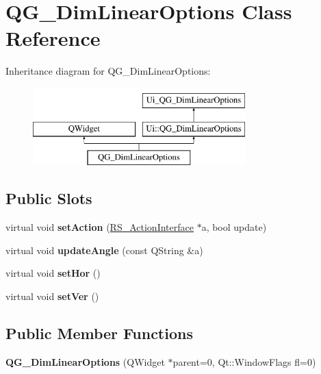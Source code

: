 \hypertarget{classQG__DimLinearOptions}{\section{Q\-G\-\_\-\-Dim\-Linear\-Options Class Reference}
\label{classQG__DimLinearOptions}
}
Inheritance diagram for Q\-G\-\_\-\-Dim\-Linear\-Options\-:\begin{figure}[H]
\begin{center}
\leavevmode
\includegraphics[height=3.000000cm]{classQG__DimLinearOptions}
\end{center}
\end{figure}
\subsection*{Public Slots}
\begin{DoxyCompactItemize}
\item 
\hypertarget{classQG__DimLinearOptions_a56da80fba8a01c219ee84cd62687ad71}{virtual void {\bfseries set\-Action} (\hyperlink{classRS__ActionInterface}{R\-S\-\_\-\-Action\-Interface} $\ast$a, bool update)}\label{classQG__DimLinearOptions_a56da80fba8a01c219ee84cd62687ad71}

\item 
\hypertarget{classQG__DimLinearOptions_a03cb7a3a74526b000b9ec5bd2edc60c9}{virtual void {\bfseries update\-Angle} (const Q\-String \&a)}\label{classQG__DimLinearOptions_a03cb7a3a74526b000b9ec5bd2edc60c9}

\item 
\hypertarget{classQG__DimLinearOptions_aca54e85c56c067e21a9867798b0d454a}{virtual void {\bfseries set\-Hor} ()}\label{classQG__DimLinearOptions_aca54e85c56c067e21a9867798b0d454a}

\item 
\hypertarget{classQG__DimLinearOptions_ae3ab318ffccea63cfc96b6f8c7d55296}{virtual void {\bfseries set\-Ver} ()}\label{classQG__DimLinearOptions_ae3ab318ffccea63cfc96b6f8c7d55296}

\end{DoxyCompactItemize}
\subsection*{Public Member Functions}
\begin{DoxyCompactItemize}
\item 
\hypertarget{classQG__DimLinearOptions_acab416a7fc2a81584720be2224754cd1}{{\bfseries Q\-G\-\_\-\-Dim\-Linear\-Options} (Q\-Widget $\ast$parent=0, Qt\-::\-Window\-Flags fl=0)}\label{classQG__DimLinearOptions_acab416a7fc2a81584720be2224754cd1}

\end{DoxyCompactItemize}
